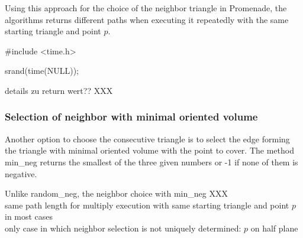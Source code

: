 \documentclass[10pt]{article}
\begin{document}
Using this approach for the choice of the neighbor triangle in {\ttfamily Promenade}, the algorithms returns different paths when executing it repeatedly with the same starting triangle and point $p$.

\#include <time.h>

srand(time(NULL));

details zu return wert?? XXX

\subsubsection{Selection of neighbor with minimal oriented volume} \label{min_neg_vol}

Another option to choose the consecutive triangle is to select the edge forming the triangle with minimal oriented volume with the point to cover. The method {\ttfamily min\_neg} returns the smallest of the three given numbers or -1 if none of them is negative.

Unlike {\ttfamily random\_neg}, the neighbor choice with {\ttfamily min\_neg} XXX \\

same path length for multiply execution with same starting triangle and point $p$ in most cases\\
only case in which neighbor selection is not uniquely determined: $p$ on half plane


\begin{figure}[h]
\end{figure}
\end{document}
